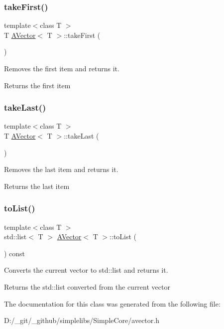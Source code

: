\subsubsection{\texorpdfstring{takeFirst()}{takeFirst()}}
{\footnotesize\ttfamily template$<$class T $>$ \\
T \mbox{\hyperlink{class_a_vector}{A\+Vector}}$<$ T $>$\+::take\+First (\begin{DoxyParamCaption}{ }\end{DoxyParamCaption})}



Removes the first item and returns it. 

\begin{DoxyReturn}{Returns}
the first item 
\end{DoxyReturn}
\mbox{\label{class_a_vector_abaa54e33aa13edba5b2e4cad679f5c1b}} 
\subsubsection{\texorpdfstring{takeLast()}{takeLast()}}
{\footnotesize\ttfamily template$<$class T $>$ \\
T \mbox{\hyperlink{class_a_vector}{A\+Vector}}$<$ T $>$\+::take\+Last (\begin{DoxyParamCaption}{ }\end{DoxyParamCaption})}



Removes the last item and returns it. 

\begin{DoxyReturn}{Returns}
the last item 
\end{DoxyReturn}
\mbox{\label{class_a_vector_a2563a5dbe02466a864d33af52c327198}} 
\subsubsection{\texorpdfstring{toList()}{toList()}}
{\footnotesize\ttfamily template$<$class T $>$ \\
std\+::list$<$ T $>$ \mbox{\hyperlink{class_a_vector}{A\+Vector}}$<$ T $>$\+::to\+List (\begin{DoxyParamCaption}{ }\end{DoxyParamCaption}) const}



Converts the current vector to std\+::list and returns it. 

\begin{DoxyReturn}{Returns}
the std\+::list converted from the current vector 
\end{DoxyReturn}


The documentation for this class was generated from the following file\+:\begin{DoxyCompactItemize}
\item 
D\+:/\+\_\+git/\+\_\+github/simplelibs/\+Simple\+Core/avector.\+h\end{DoxyCompactItemize}
